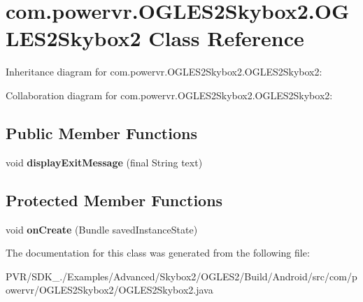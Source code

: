 \hypertarget{classcom_1_1powervr_1_1_o_g_l_e_s2_skybox2_1_1_o_g_l_e_s2_skybox2}{\section{com.\+powervr.\+O\+G\+L\+E\+S2\+Skybox2.\+O\+G\+L\+E\+S2\+Skybox2 Class Reference}
\label{classcom_1_1powervr_1_1_o_g_l_e_s2_skybox2_1_1_o_g_l_e_s2_skybox2}
}


Inheritance diagram for com.\+powervr.\+O\+G\+L\+E\+S2\+Skybox2.\+O\+G\+L\+E\+S2\+Skybox2\+:


Collaboration diagram for com.\+powervr.\+O\+G\+L\+E\+S2\+Skybox2.\+O\+G\+L\+E\+S2\+Skybox2\+:
\subsection*{Public Member Functions}
\begin{DoxyCompactItemize}
\item 
\hypertarget{classcom_1_1powervr_1_1_o_g_l_e_s2_skybox2_1_1_o_g_l_e_s2_skybox2_ab121c806c7d44aee3a18efa373e39740}{void {\bfseries display\+Exit\+Message} (final String text)}\label{classcom_1_1powervr_1_1_o_g_l_e_s2_skybox2_1_1_o_g_l_e_s2_skybox2_ab121c806c7d44aee3a18efa373e39740}

\end{DoxyCompactItemize}
\subsection*{Protected Member Functions}
\begin{DoxyCompactItemize}
\item 
\hypertarget{classcom_1_1powervr_1_1_o_g_l_e_s2_skybox2_1_1_o_g_l_e_s2_skybox2_aa925037009dd0c73cae6d732178d1aff}{void {\bfseries on\+Create} (Bundle saved\+Instance\+State)}\label{classcom_1_1powervr_1_1_o_g_l_e_s2_skybox2_1_1_o_g_l_e_s2_skybox2_aa925037009dd0c73cae6d732178d1aff}

\end{DoxyCompactItemize}


The documentation for this class was generated from the following file\+:\begin{DoxyCompactItemize}
\item 
P\+V\+R/\+S\+D\+K\+\_./\+Examples/\+Advanced/\+Skybox2/\+O\+G\+L\+E\+S2/\+Build/\+Android/src/com/powervr/\+O\+G\+L\+E\+S2\+Skybox2/O\+G\+L\+E\+S2\+Skybox2.\+java\end{DoxyCompactItemize}
